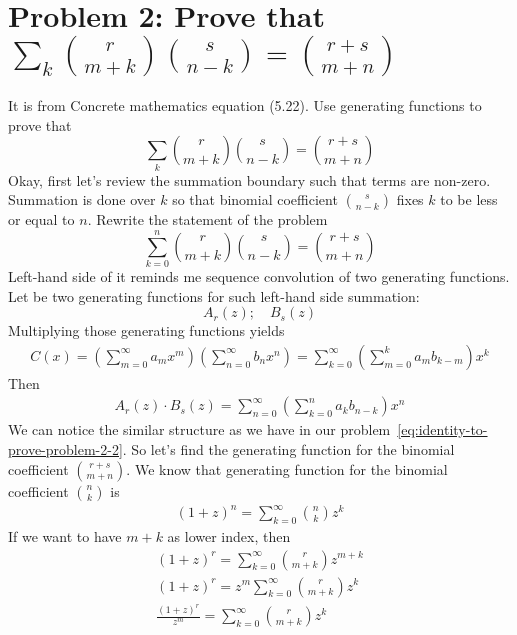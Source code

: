 ﻿\section{Problem 2: Prove that $\sum_{k} \binom{r}{m+k} \binom{s}{n-k} = \binom{r+s}{m+n}$}
\label{sec:problem-2:-concrete-mathematics-equation-(5.22)}
It is from Concrete mathematics equation (5.22).
Use generating functions to prove that
\begin{equation}
    \sum_{k} \binom{r}{m+k} \binom{s}{n-k} = \binom{r+s}{m+n}
    \label{eq:identity-to-prove-problem-2}
\end{equation}
Okay, first let's review the summation boundary such that terms are non-zero.
Summation is done over $k$ so that binomial coefficient $\binom{s}{n-k}$ fixes $k$ to be less or equal to $n$.
Rewrite the statement of the problem
\begin{equation}
    \sum_{k=0}^{n} \binom{r}{m+k} \binom{s}{n-k} = \binom{r+s}{m+n}
    \label{eq:identity-to-prove-problem-2-2}
\end{equation}
Left-hand side of it reminds me sequence convolution of two generating functions.
Let be two generating functions for such left-hand side summation:
\begin{equation*}
    A_r(z); \quad B_s(z)
\end{equation*}
Multiplying those generating functions yields
\begin{align*}
    C(x) = \left(\sum_{m=0}^{\infty} a_m x^m\right) \left(\sum_{n=0}^{\infty} b_n x^n\right) = \sum_{k=0}^{\infty} \left( \sum_{m=0}^{k} a_m b_{k-m} \right) x^k
\end{align*}
Then
\begin{align*}
    A_r(z) \cdot B_s(z) = \sum_{n=0}^{\infty} \left( \sum_{k=0}^{n} a_k b_{n-k} \right) x^n
\end{align*}
We can notice the similar structure as we have in our problem~\eqref{eq:identity-to-prove-problem-2-2}.
So let's find the generating function for the binomial coefficient $\binom{r+s}{m+n}$.
We know that generating function for the binomial coefficient $\binom{n}{k}$ is
\begin{align*}
(1+z)
    ^{n} = \sum_{k=0}^{\infty} \binom{n}{k} z^k
\end{align*}
If we want to have $m+k$ as lower index, then
\begin{align*}
(1+z)
    ^{r} = \sum_{k=0}^{\infty} \binom{r}{m+k} z^{m+k} \\
    (1+z)^{r} = z^m \sum_{k=0}^{\infty} \binom{r}{m+k} z^{k} \\
    \frac{(1+z)^{r}}{z^m} = \sum_{k=0}^{\infty} \binom{r}{m+k} z^{k}
\end{align*}
